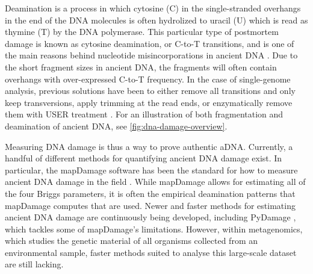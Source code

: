 Deamination is a process in which cytosine (C) in the single-stranded overhangs in the end of the DNA molecules is often hydrolized to uracil (U) which is read as thymine (T) by the DNA polymerase. This particular type of postmortem damage is known as cytosine deamination, or C-to-T transitions, and is one of the main reasons behind nucleotide misincorporations in ancient DNA \autocite{briggsPatternsDamageGenomic2007}. Due to the short fragment sizes in ancient DNA, the fragments will often contain overhangs with over-expressed C-to-T frequency. In the case of single-genome analysis, previous solutions have been to either remove all transitions and only keep transversions, apply trimming at the read ends, or enzymatically remove them with USER treatment \autocite{schubertImprovingAncientDNA2012,rohlandPartialUracilDNAglycosylaseTreatment2015}.
For an illustration of both fragmentation and deamination of ancient DNA, see  \autoref{fig:dna-damage-overview}.

Measuring DNA damage is thus a way to prove authentic aDNA. Currently, a handful of different methods for quantifying ancient DNA damage exist. In particular, the mapDamage software has been the standard for how to measure ancient DNA damage in the field \autocite{jonssonMapDamage2FastApproximate2013}. While mapDamage allows for estimating all of the four Briggs parameters, it is often the empirical deamination patterns that mapDamage computes that are used. Newer and faster methods for estimating ancient DNA damage are continuously being developed, including PyDamage \autocite{borryPyDamageAutomatedAncient2021}, which tackles some of mapDamage's limitations. However, within metagenomics, which studies the genetic material of all organisms collected from an environmental sample, faster methods suited to analyse this large-scale dataset are still lacking.

